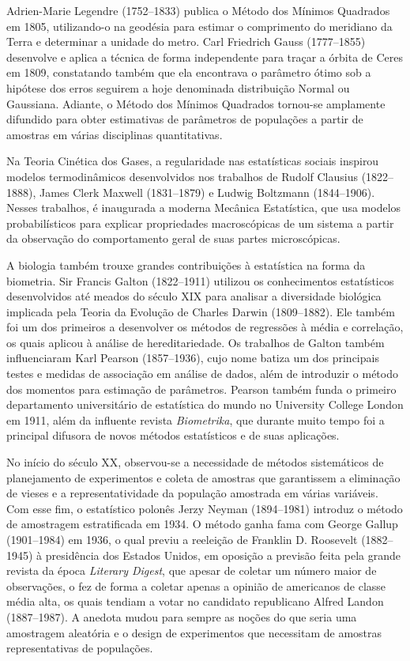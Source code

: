 Adrien-Marie Legendre (1752--1833) publica o Método dos Mínimos Quadrados em 1805,
utilizando-o na geodésia para estimar o comprimento do meridiano da Terra e determinar a
unidade do metro.
Carl Friedrich Gauss (1777--1855) desenvolve e aplica a técnica de forma independente para traçar a
órbita de Ceres em 1809, constatando também que ela encontrava o parâmetro ótimo sob a
hipótese dos erros seguirem a hoje denominada distribuição Normal ou Gaussiana.
Adiante, o Método dos Mínimos Quadrados tornou-se amplamente difundido para obter
estimativas de parâmetros de populações a partir de amostras em várias disciplinas
quantitativas.

Na Teoria Cinética dos Gases, a regularidade nas estatísticas sociais inspirou modelos
termodinâmicos desenvolvidos nos trabalhos de Rudolf Clausius (1822--1888), James Clerk
Maxwell (1831--1879) e Ludwig Boltzmann (1844--1906).
Nesses trabalhos, é inaugurada a moderna Mecânica Estatística, que usa modelos
probabilísticos para explicar propriedades macroscópicas de um sistema a partir da
observação do comportamento geral de suas partes microscópicas.

A biologia também trouxe grandes contribuições à estatística na forma da biometria.
Sir Francis Galton (1822--1911) utilizou os conhecimentos estatísticos desenvolvidos até
meados do século XIX para analisar a diversidade biológica implicada pela Teoria da
Evolução de Charles Darwin (1809--1882).
Ele também foi um dos primeiros a desenvolver os métodos de regressões à média e
correlação, os quais aplicou à análise de hereditariedade.
Os trabalhos de Galton também influenciaram Karl Pearson (1857--1936), cujo nome batiza um dos
principais testes e medidas de associação em análise de dados, além de introduzir
o método dos momentos para estimação de parâmetros.
Pearson também funda o primeiro departamento universitário de estatística do mundo no
University College London em 1911, além da influente revista \textit{Biometrika}, que
durante muito tempo foi a principal difusora de novos métodos estatísticos e de
suas aplicações.

No início do século XX, observou-se a necessidade de métodos sistemáticos de planejamento
de experimentos e coleta de amostras que garantissem a eliminação de vieses e a
representatividade da população amostrada em várias variáveis.
Com esse fim, o estatístico polonês Jerzy Neyman (1894--1981) introduz o método de
amostragem estratificada em 1934.
O método ganha fama com George Gallup (1901--1984) em 1936, o qual previu a reeleição
de Franklin D. Roosevelt (1882--1945) à presidência dos Estados Unidos, em oposição a
previsão feita pela grande revista da época \textit{Literary Digest}, que apesar de
coletar um número maior de observações, o fez de forma a coletar apenas a opinião de
americanos de classe média alta, os quais tendiam a votar no candidato republicano
Alfred Landon (1887--1987).
A anedota mudou para sempre as noções do que seria uma amostragem aleatória e o design de
experimentos que necessitam de amostras representativas de populações.

